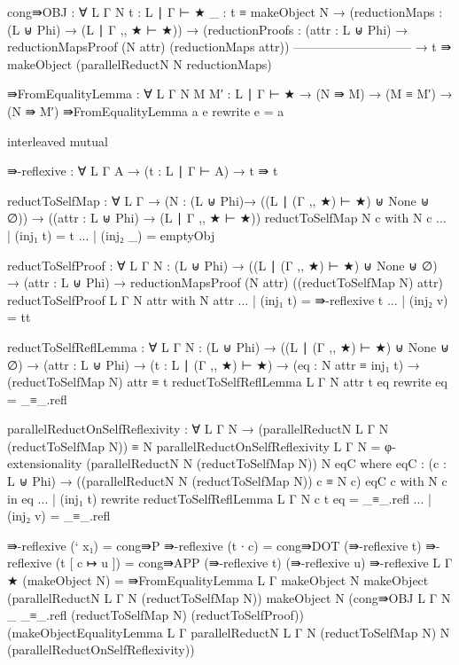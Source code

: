 {\begin{code}
    cong⇛OBJ : ∀ {L Γ N}
      {t : L ∣ Γ ⊢ ★}
      {_ : t ≡ makeObject N}
      → (reductionMaps : (L ⊎ Phi) → (L ∣ Γ ,, ★ ⊢ ★))
      → (reductionProofs :
        (attr : L ⊎ Phi) → reductionMapsProof (N attr) (reductionMaps attr))
      -----------------------------
      → t ⇛ makeObject (parallelReductN N reductionMaps)

⇛FromEqualityLemma :
  ∀ {L Γ} {N M M′ : L ∣ Γ ⊢ ★} → (N ⇛ M) → (M ≡ M′) → (N ⇛ M′)
⇛FromEqualityLemma a e rewrite e = a

interleaved mutual

  ⇛-reflexive : ∀ {L Γ A} → (t : L ∣ Γ ⊢ A) → t ⇛ t

  reductToSelfMap : ∀ {L Γ}
    → (N : (L ⊎ Phi)→ ((L ∣ (Γ ,, ★) ⊢ ★) ⊎ None ⊎ ∅))
    → ((attr : L ⊎ Phi) → (L ∣ Γ ,, ★ ⊢ ★))
  reductToSelfMap N c with N c
  ... | (inj₁ t) = t
  ... | (inj₂ _) = emptyObj

  reductToSelfProof : ∀ {L Γ}
    {N : (L ⊎ Phi) → ((L ∣ (Γ ,, ★) ⊢ ★) ⊎ None ⊎ ∅)}
    → (attr : L ⊎ Phi)
    → reductionMapsProof (N attr) ((reductToSelfMap N) attr)
  reductToSelfProof {L} {Γ} {N} attr with N attr
  ... | (inj₁ t) = ⇛-reflexive t
  ... | (inj₂ v) = tt 

  reductToSelfReflLemma : ∀ {L Γ}
    {N : (L ⊎ Phi) → ((L ∣ (Γ ,, ★) ⊢ ★) ⊎ None ⊎ ∅)}
    → (attr : L ⊎ Phi)
    → (t : L ∣ (Γ ,, ★) ⊢ ★)
    → (eq : N attr ≡ inj₁ t)
    → (reductToSelfMap N) attr ≡ t
  reductToSelfReflLemma {L} {Γ} {N} attr t eq rewrite eq = _≡_.refl

  parallelReductOnSelfReflexivity : ∀ {L Γ N}
    → (parallelReductN {L} {Γ} N (reductToSelfMap N)) ≡ N
  parallelReductOnSelfReflexivity {L} {Γ} {N} =
    φ-extensionality (parallelReductN N (reductToSelfMap N)) N eqC where
      eqC : (c : L ⊎ Phi)
        → ((parallelReductN N (reductToSelfMap N)) c ≡ N c)
      eqC c with N c in eq
      ... | (inj₁ t) rewrite reductToSelfReflLemma {L} {Γ} {N} c t eq =
        _≡_.refl
      ... | (inj₂ v) = _≡_.refl

  ⇛-reflexive (` x₁) = cong⇛P
  ⇛-reflexive (t ∙ c) = cong⇛DOT (⇛-reflexive t)
  ⇛-reflexive (t [ c ↦ u ]) = cong⇛APP (⇛-reflexive t) (⇛-reflexive u)
  ⇛-reflexive {L} {Γ} {★} (makeObject N) = 
    ⇛FromEqualityLemma {L} {Γ}
      {makeObject N}
      {makeObject (parallelReductN {L} {Γ} N (reductToSelfMap N))}
      {makeObject N}
      (cong⇛OBJ {L} {Γ} {N} {_} {_≡_.refl}
        (reductToSelfMap N) (reductToSelfProof))
      (makeObjectEqualityLemma
        {L} {Γ}
        {parallelReductN {L} {Γ} N (reductToSelfMap N)}
        {N} (parallelReductOnSelfReflexivity))


\end{code}}
